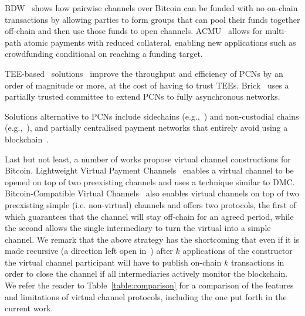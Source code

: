   BDW~\cite{scalable-funding} shows how pairwise channels over Bitcoin can be   funded with no on-chain transactions by allowing parties to form groups that   can pool their funds together off-chain and then use those funds to open   channels. ACMU~\cite{10.1145/3319535.3345666} allows for multi-path atomic   payments with reduced collateral, enabling new applications such as   crowdfunding conditional on reaching a funding target.

  TEE-based~\cite{zhao2019sok}
solutions~\cite{teechan,10.1145/3341301.3359627,liao2021speedster,lee2020routee}
  improve the throughput and efficiency of PCNs by an order of magnitude or
  more, at the cost of having to trust TEEs. Brick~\cite{avarikioti2020brick}
  uses a partially trusted committee to extend PCNs to fully asynchronous
  networks.

  Solutions alternative to PCNs include 
side\-chains (e.g.,~\cite{BCDF+14,sidechains,KiaZin18}) and
non-custodial chains (e.g.,~\cite{plasma,konstantopoulos2019plasma,plasma-lower-bounds,rollup}),
  and partially centralised payment networks that entirely avoid using a blockchain~\cite{DBLP:conf/trust/ArmknechtKMYZ15,stellar,silentwhispers,DBLP:conf/ndss/RoosMKG18}. 

  Last but not least, a number of works propose virtual channel constructions
  for Bitcoin. Lightweight Virtual Payment
  Channels~\cite{10.1007/978-3-030-65411-5_18} enables a virtual channel to be
  opened on top of two preexisting channels and uses a technique similar to DMC.
  Bitcoin-Compatible Virtual Channels~\cite{cryptoeprint:2020:554} also enables
  virtual channels on top of two preexisting simple (i.e. non-virtual) channels
  and offers two protocols, the first of which guarantees that the channel will
  stay off-chain for an agreed period, while the second allows the single intermediary
  to turn the virtual into a simple channel. 
  We remark that the above strategy has the shortcoming that even if it is made
  recursive (a direction left open in~\cite{cryptoeprint:2020:554}) after $k$
  applications of the constructor the virtual channel participant will have to
  publish on-chain $k$ transactions in order to close the channel if all
  intermediaries actively monitor the blockchain.
  We refer the reader to Table~\ref{table:comparison} for a comparison of the
  features and limitations of virtual channel protocols, including the one put
  forth in the current work.

